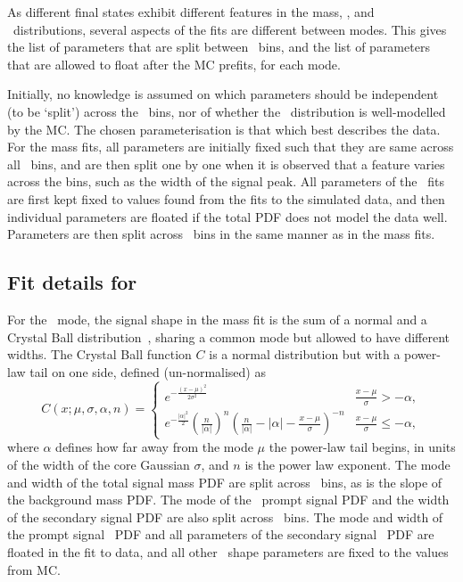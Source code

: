 As different final states exhibit different features in the mass, \deltam, and 
\lnipchisq\ distributions, several aspects of the fits are different between 
modes.
This  gives the list of parameters that are 
split between \pTy\ bins, and the list of parameters that are allowed to float 
after the \ac{MC} prefits, for each mode.

Initially, no knowledge is assumed on which parameters should be independent 
(to be `split') across the \pTy\ bins, nor of whether the \lnipchisq\ 
distribution is well-modelled by the \ac{MC}.
The chosen parameterisation is that which best describes the data.
For the mass fits, all parameters are initially fixed such that they are same 
across all \pTy\ bins, and are then split one by one when it is observed that a 
feature varies across the bins, such as the width of the signal peak.
All parameters of the \lnipchisq\ fits are first kept fixed to values found 
from the fits to the simulated data, and then individual parameters are floated 
if the total PDF does not model the data well.
Parameters are then split across \pTy\ bins in the same manner as in the mass 
fits.

\subsection{Fit details for \PDzero}
\label{chap:prod:fitting:details:D0ToKpi}

For the \DzToKpi\ mode, the signal shape in the mass fit is the sum of a normal 
and a Crystal Ball distribution~\cite{Skwarnicki:1986xj}, sharing a common mode 
but allowed to have different widths.
The Crystal Ball function $C$ is a normal distribution but with a power-law 
tail on one side, defined (un-normalised) as
\begin{equation}
  C(x; \mu, \sigma, \alpha, n) = \begin{cases}
    e^{-\frac{{(x - \mu)}^{2}}{2\sigma^{2}}}                          & \frac{x - \mu}{\sigma} > -\alpha, \\
    e^{-\frac{|\alpha|^{2}}{2}}
      {(\frac{n}{|\alpha|})}^{n}
      {(\frac{n}{|\alpha|} - |\alpha| - \frac{x - \mu}{\sigma})}^{-n} & \frac{x - \mu}{\sigma} \leq -\alpha,
  \end{cases}
  \label{eqn:prod:fitting:crystal_ball}
\end{equation}
where $\alpha$ defines how far away from the mode $\mu$ the power-law tail 
begins, in units of the width of the core Gaussian $\sigma$, and $n$ is the 
power law exponent.
The mode and width of the total signal mass \ac{PDF} are split across \pTy\ 
bins, as is the slope of the background mass \ac{PDF}.
The mode of the \lnipchisq\ prompt signal \ac{PDF} and the width of the 
secondary signal \ac{PDF} are also split across \pTy\ bins.
The mode and width of the prompt signal \lnipchisq\ \ac{PDF} and all parameters 
of the secondary signal \lnipchisq\ \ac{PDF} are floated in the fit to data, 
and all other \lnipchisq\ shape parameters are fixed to the values from 
\ac{MC}.

